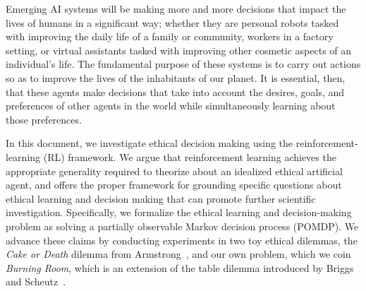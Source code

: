 \documentclass[11pt]{article}
\newcommand\jmnote[1]{\textcolor{red}{James: #1}}
\begin{document}
Emerging AI systems will be making more and more decisions that impact the lives of humans in a significant way; whether they are personal robots tasked with improving the daily life of a family or community,  workers in a factory setting, or virtual assistants tasked with improving other cosmetic aspects of an individual's life. The fundamental purpose of these systems is to carry out actions so as to improve the lives of the inhabitants of our planet. It is essential, then, that these agents make decisions that take into account the desires, goals, and preferences of other agents in the world while simultaneously learning about those preferences. 

In this document, we investigate ethical decision making using the reinforcement-learning (RL) framework. We argue that reinforcement learning achieves the appropriate generality required to theorize about an idealized ethical artificial agent, and offers the proper framework for grounding specific questions about ethical learning and decision making that can promote further scientific investigation. Specifically, we formalize the ethical learning and decision-making problem as solving a partially observable Markov decision process (POMDP). We advance these claims by conducting experiments in two toy ethical dilemmas, the {\it Cake or Death} dilemma from Armstrong~, and our own problem, which we coin {\it Burning Room}, which is an extension of the table dilemma introduced by Briggs and Scheutz~.

\end{document}
